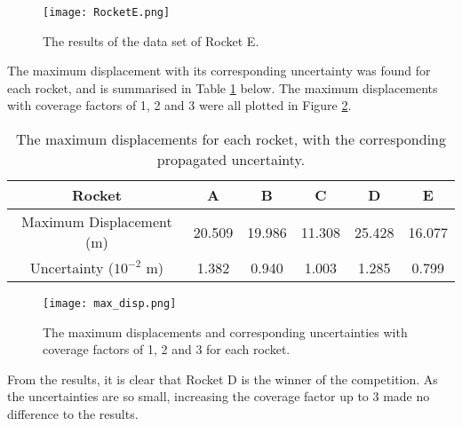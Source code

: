\documentclass{article}
\begin{document}
        \begin{figure}[H]
            \centering
            \texttt{[image: RocketE.png]}
            \caption{The results of the data set of Rocket E.}
            \label{fig:RocketE}
        \end{figure}

        The maximum displacement with its corresponding uncertainty was found for each rocket, and is summarised in Table \ref{tab:final-results} below. The maximum displacements with coverage factors of 1, 2 and 3 were all plotted in Figure \ref{fig:max-disps}. 

        \begin{table}[H]
            \centering
            \begin{tabular}{|c|c|c|c|c|c|}
            \hline
                Rocket & A & B & C & D & E \\
                \hline
                Maximum Displacement (m) & 20.509 & 19.986 & 11.308 & 25.428 & 16.077 \\
                \hline
                Uncertainty ($10^{-2}$ m) & 1.382 & 0.940 & 1.003 & 1.285 & 0.799 \\
                \hline
            \end{tabular}
            \caption{The maximum displacements for each rocket, with the corresponding propagated uncertainty.}
            \label{tab:final-results}
        \end{table}

        \begin{figure}[H]
            \centering
            \texttt{[image: max\_disp.png]}
            \caption{The maximum displacements and corresponding uncertainties with coverage factors of 1, 2 and 3 for each rocket.}
            \label{fig:max-disps}
        \end{figure}

        From the results, it is clear that Rocket D is the winner of the competition. As the uncertainties are so small, increasing the coverage factor up to 3 made no difference to the results. 

\printbibliography
\end{document}
